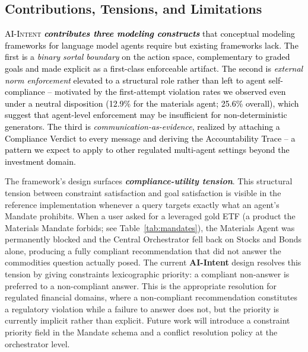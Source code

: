 \documentclass[runningheads]{llncs}
\begin{document}
\subsection {Contributions, Tensions, and Limitations}
\textcolor{black}{\textsc{AI-Intent} \textbf{\textit{contributes three modeling constructs}} that conceptual modeling frameworks for language model agents require but existing frameworks lack. The first is a \emph{binary sortal boundary} on the action space, complementary to graded goals and made explicit as a first-class enforceable artifact. The second is \emph{external norm enforcement} elevated to a structural role rather than left to agent self-compliance -- motivated by the first-attempt violation rates we observed even under a neutral disposition (12.9\% for the materials agent; 25.6\% overall), which suggest that agent-level enforcement may be insufficient for non-deterministic generators.
The third is \emph{communication-as-evidence}, realized by attaching a Compliance Verdict to every message and deriving the Accountability Trace -- a pattern we expect to apply to other regulated multi-agent settings beyond the investment domain.}

The framework's design surfaces \textbf{\textit{compliance-utility tension}}. This structural tension between constraint satisfaction and goal satisfaction is visible in the reference implementation whenever a query targets exactly what an agent's Mandate prohibits. When a user asked for a leveraged gold ETF (a product the Materials Mandate forbids; see Table~\ref{tab:mandates}), the Materials Agent was permanently blocked and the Central Orchestrator fell back on Stocks and Bonds alone, producing a fully compliant recommendation that did not answer the commodities question actually posed.
The current \textbf{AI-Intent} design resolves this tension by giving constraints lexicographic priority: a compliant non-answer is preferred to a non-compliant answer. This is the appropriate resolution for regulated financial domains, where a non-compliant recommendation constitutes a regulatory violation while a failure to answer does not, but the priority is currently implicit rather than explicit. Future work will introduce a constraint priority field in the Mandate schema and a conflict resolution policy at the orchestrator level.
\end{document}
